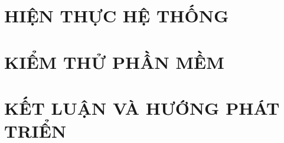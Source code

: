 \documentclass[12pt,a4paper]{report}
\begin{document}
\chapter{\textbf{HIỆN THỰC HỆ THỐNG}}


\chapter{\textbf{KIỂM THỬ PHẦN MỀM}}


\chapter{\textbf{KẾT LUẬN VÀ HƯỚNG PHÁT TRIỂN}}

\end{document}
